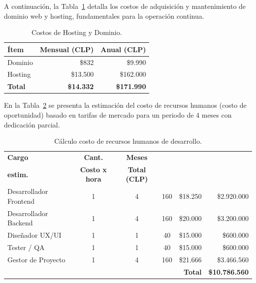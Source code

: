 A continuación, la Tabla~\ref{tab:costos_servicios} detalla los costos de adquisición y mantenimiento de dominio web y hosting, fundamentales para la operación continua.

\begin{table}[H]
    \centering
    \caption{Costos de Hosting y Dominio.}
    \label{tab:costos_servicios}
    \begin{tabular}{|l|r|r|}
    \hline
    \textbf{Ítem} & \textbf{Mensual (CLP)} & \textbf{Anual (CLP)}\\
    \hline
    Dominio & \$832 & \$9.990\\
    Hosting & \$13.500 & \$162.000\\
    \hline
    \textbf{Total} & \textbf{\$14.332} & \textbf{\$171.990}\\
    \hline
    \end{tabular}
\end{table}

En la Tabla~\ref{tab:costos_rrhh} se presenta la estimación del costo de recursos humanos (costo de oportunidad) basado en tarifas de mercado para un periodo de 4 meses con dedicación parcial.

\begin{table}[H]
    \centering
    \caption{Cálculo costo de recursos humanos de desarrollo.}
    \label{tab:costos_rrhh}
    {\small\setlength{\tabcolsep}{3pt}
    \renewcommand{\arraystretch}{1.1}
    \begin{tabular}{|p{}|c|c|c|r|r|}
    \hline
    \textbf{Cargo} & \textbf{Cant.} & \textbf{Meses} & \shortstack{\textbf{Horas}\\\textbf{estim.}} & \textbf{Costo x hora} & \textbf{Total (CLP)}\\
    \hline
    Desarrollador Frontend & 1 & 4 & 160 & \$18.250 & \$2.920.000\\
    Desarrollador Backend  & 1 & 4 & 160 & \$20.000 & \$3.200.000\\
    Diseñador UX/UI        & 1 & 1 &  40 & \$15.000 &   \$600.000\\
    Tester / QA            & 1 & 1 &  40 & \$15.000 &   \$600.000\\
    Gestor de Proyecto     & 1 & 4 & 160 & \$21.666 & \$3.466.560\\
    \hline
    \multicolumn{5}{|r|}{\textbf{Total}} & \textbf{\$10.786.560}\\
    \hline
    \end{tabular}
    }
\end{table}

